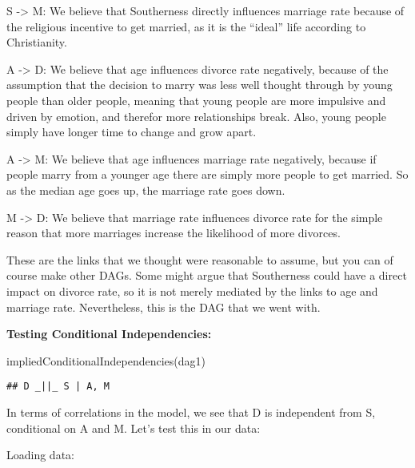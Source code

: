 \documentclass[
]{article}
\newenvironment{Shaded}{\begin{snugshade}}{\end{snugshade}}
\newcommand{\DecValTok}[1]{\textcolor[rgb]{0.00,0.00,0.81}{#1}}
\newcommand{\FunctionTok}[1]{\textcolor[rgb]{0.00,0.00,0.00}{#1}}
\newcommand{\NormalTok}[1]{#1}
\newcommand{\OtherTok}[1]{\textcolor[rgb]{0.56,0.35,0.01}{#1}}
\newcommand{\SpecialCharTok}[1]{\textcolor[rgb]{0.00,0.00,0.00}{#1}}
\begin{document}
S -\textgreater{} M: We believe that Southerness directly influences
marriage rate because of the religious incentive to get married, as it
is the ``ideal'' life according to Christianity.

A -\textgreater{} D: We believe that age influences divorce rate
negatively, because of the assumption that the decision to marry was
less well thought through by young people than older people, meaning
that young people are more impulsive and driven by emotion, and therefor
more relationships break. Also, young people simply have longer time to
change and grow apart.

A -\textgreater{} M: We believe that age influences marriage rate
negatively, because if people marry from a younger age there are simply
more people to get married. So as the median age goes up, the marriage
rate goes down.

M -\textgreater{} D: We believe that marriage rate influences divorce
rate for the simple reason that more marriages increase the likelihood
of more divorces.

These are the links that we thought were reasonable to assume, but you
can of course make other DAGs. Some might argue that Southerness could
have a direct impact on divorce rate, so it is not merely mediated by
the links to age and marriage rate. Nevertheless, this is the DAG that
we went with.

\textbf{Testing Conditional Independencies:}

\begin{Shaded}
\begin{Highlighting}[]
\FunctionTok{impliedConditionalIndependencies}\NormalTok{(dag1)}
\end{Highlighting}
\end{Shaded}

\begin{verbatim}
## D _||_ S | A, M
\end{verbatim}

In terms of correlations in the model, we see that D is independent from
S, conditional on A and M. Let's test this in our data:

Loading data:

\begin{Shaded}
\end{Shaded}
\end{document}
